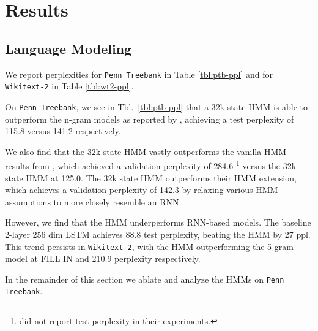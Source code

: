 \documentclass[11pt,a4paper]{article}
\begin{document}
\section{Results}
\subsection{Language Modeling}
We report perplexities 
for \texttt{Penn Treebank} in Table \ref{tbl:ptb-ppl}
and for \texttt{Wikitext-2} in Table \ref{tbl:wt2-ppl}.

On \texttt{Penn Treebank}, we see in Tbl.~\ref{tbl:ptb-ppl}
that a 32k state HMM is able to outperform the n-gram models
as reported by \citet{mikolov2012rnn}, achieving a test perplexity of
115.8 versus 141.2 respectively.

We also find that the 32k state HMM vastly outperforms the vanilla HMM results from \citet{buys2018hmm},
which achieved a validation perplexity of 284.6
\footnote{\citet{buys2018hmm} did not report test perplexity in their experiments.}
versus the 32k state HMM at 125.0.
The 32k state HMM outperforms their HMM extension, which achieves a
validation perplexity of 142.3 by relaxing various HMM assumptions
to more closely resemble an RNN.

However, we find that the HMM underperforms RNN-based models.
The baseline 2-layer 256 dim LSTM achieves 88.8 test perplexity,
beating the HMM by 27 ppl.
This trend persists in \texttt{Wikitext-2},
with the HMM outperforming the 5-gram model at {\color{red}FILL IN}
and 210.9 perplexity respectively.

In the remainder of this section we ablate and analyze the HMMs on \texttt{Penn Treebank}.
\end{document}
